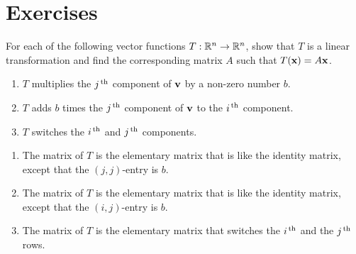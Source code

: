 \section*{Exercises}

\begin{ex}
  For each of the following vector functions $T:\mathbb{R}^n\to\mathbb{R}^n$, show
  that $T$ is a linear transformation and find the corresponding
  matrix $A$ such that $T(\vect{x}) = A\vect{x}$.
  \begin{enumerate}
  \item $T$ multiplies the $j^{\,\rm th}$ component of $\vect{v}$ by a
    non-zero number $b$.
  \item $T$ adds $b$ times the
    $j^{\,\rm th}$ component of $\vect{v}$ to the $i^{\,\rm th}$ component.
  \item $T$ switches the $i^{\,\rm th}$ and $j^{\,\rm th}$ components.
  \end{enumerate}
  \begin{sol}
    \begin{enumerate}
    \item The matrix of $T$ is the elementary matrix that is like the
      identity matrix, except that the $(j,j)$-entry is $b$.
    \item The matrix of $T$ is the elementary matrix that is like the
      identity matrix, except that the $(i,j)$-entry is $b$.
    \item The matrix of $T$ is the elementary matrix that switches the
      $i^{\,\rm th}$ and the $j^{\,\rm th}$ rows.
    \end{enumerate}
  \end{sol}
\end{ex}

